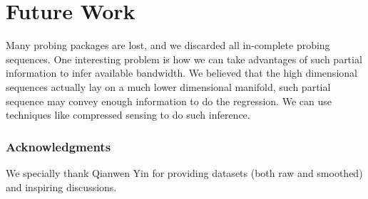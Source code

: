 
\section{Future Work}
\label{sec:future_work}
Many probing packages are lost, and we discarded all in-complete probing
sequences. One interesting problem is how we can take advantages of such
partial information to infer available bandwidth. We believed that the high
dimensional sequences actually lay on a much lower dimensional manifold, such
partial sequence may convey enough information to do the regression. We can use
techniques like compressed sensing\cite{donoho2006compressed} to do such inference.


\subsubsection*{Acknowledgments}

We specially thank Qianwen Yin for providing datasets (both raw and smoothed)
and inspiring discussions.
